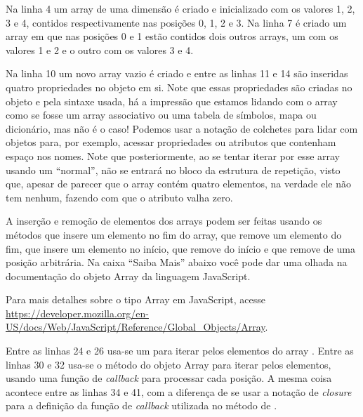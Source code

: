 Na linha 4 um array de uma dimensão é criado e inicializado com os valores 1, 2, 3 e 4, contidos respectivamente nas posições 0, 1, 2 e 3. Na linha 7 é criado um array em que nas posições 0 e 1 estão contidos dois outros arrays, um com os valores 1 e 2 e o outro com os valores 3 e 4.

Na linha 10 um novo array vazio é criado e entre as linhas 11 e 14 são inseridas quatro propriedades no objeto em si. Note que essas propriedades são criadas no objeto e pela sintaxe usada, há a impressão que estamos lidando com o array como se fosse um array associativo ou uma tabela de símbolos, mapa ou dicionário, mas não é o caso! Podemos usar a notação de colchetes para lidar com objetos para, por exemplo, acessar propriedades ou atributos que contenham espaço nos nomes. Note que posteriormente, ao se tentar iterar por esse array usando um  ``normal'', não se entrará no bloco da estrutura de repetição, visto que, apesar de parecer que o array contém quatro elementos, na verdade ele não tem nenhum, fazendo com que o atributo  valha zero.

A inserção e remoção de elementos dos arrays podem ser feitas usando os métodos  que insere um elemento no fim do array,  que remove um elemento do fim,  que insere um elemento no início,  que remove do início e  que remove de uma posição arbitrária. Na caixa ``Saiba Mais'' abaixo você pode dar uma olhada na documentação do objeto Array da linguagem JavaScript.

\begin{saibaMais}
    Para mais detalhes sobre o tipo Array em JavaScript, acesse \url{https://developer.mozilla.org/en-US/docs/Web/JavaScript/Reference/Global_Objects/Array}.
\end{saibaMais}

Entre as linhas 24 e 26 usa-se um  para iterar pelos elementos do array . Entre as linhas 30 e 32 usa-se o método  do objeto Array para iterar pelos elementos, usando uma função de \textit{callback} para processar cada posição. A mesma coisa acontece entre as linhas 34 e 41, com a diferença de se usar a notação de \textit{closure} para a definição da função de \textit{callback} utilizada no método  de .

